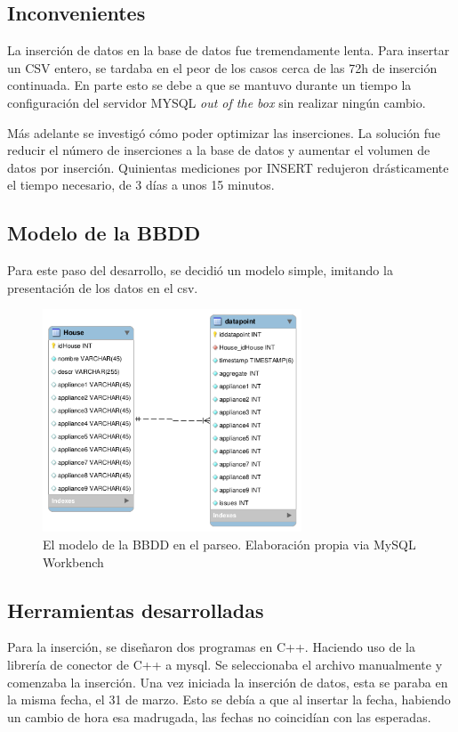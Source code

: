 \subsection{Inconvenientes}
La inserción de datos en la base de datos fue tremendamente lenta. Para insertar un CSV entero, se tardaba en el peor de los casos cerca de las 72h de inserción continuada.
En parte esto se debe a que se mantuvo durante un tiempo la configuración del servidor MYSQL \textit{out of the box} sin realizar ningún cambio.

Más adelante se investigó cómo poder optimizar las inserciones. La solución fue reducir el número de inserciones a la base de datos y aumentar el volumen de datos por inserción. Quinientas mediciones por INSERT redujeron drásticamente el tiempo necesario, de 3 días a unos 15 minutos.

\subsection{Modelo de la BBDD}
Para este paso del desarrollo, se decidió un modelo simple, imitando la presentación de los datos en el csv.
\begin{figure}[H]
    \centering
    \includegraphics[height=250px]{images/db_parsingstep.png}
    \caption{El modelo de la BBDD en el parseo. Elaboración propia via MySQL Workbench}
    \label{diagramaBBDD}
\end{figure}

\subsection{Herramientas desarrolladas}
Para la inserción, se diseñaron dos programas en C++. Haciendo uso de la librería de conector de C++ a mysql. Se seleccionaba el archivo manualmente y comenzaba la inserción. 
Una vez iniciada la inserción de datos, esta se paraba en la misma fecha, el 31 de marzo. Esto se debía a que al insertar la fecha, habiendo un cambio de hora esa madrugada, las fechas no coincidían con las esperadas.

